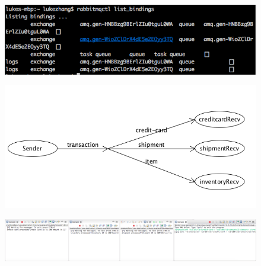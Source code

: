 \documentclass[12pt,letterpaper,boxed]{hmcpset}
\begin{document}
\begin{figure}[H]
  \centering
  \includegraphics[width = 1.0\textwidth]{7.png}
\end{figure}
\begin{figure}[H]
  \centering
  \includegraphics[width = 1.0\textwidth]{9.png}
\end{figure}
\begin{figure}[H]
  \centering
  \includegraphics[width = 1.0\textwidth]{8.png}
\end{figure}
\end{document}

